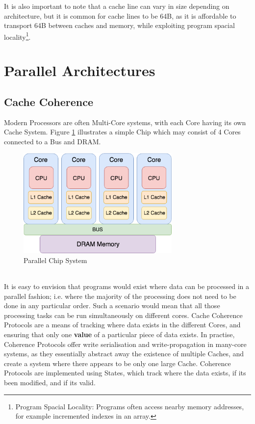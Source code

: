 \documentclass[bsc,frontabs,twoside,singlespacing,parskip,deptreport]{infthesis}     %
\begin{document}
It is also important to note that a cache line can vary in size depending on architecture, but it is common for cache lines to be 64B, as it is affordable to transport 64B between caches and memory, while exploiting program spacial locality\footnote{Program Spacial Locality: Programs often access nearby memory addresses, for example incremented indexes in an array.}.

\newpage

\section{Parallel Architectures}

\subsection{Cache Coherence}\label{cache-coherence}
Modern Processors are often Multi-Core systems, with each Core having its own Cache System. Figure \ref{fig:parallel-cpu} illustrates a simple Chip which may consist of 4 Cores connected to a Bus and DRAM. \\
\begin{figure}[!h]
    \centering
    \includegraphics[width=8cm]{Parallel.png}
    \caption{Parallel Chip System}
    \label{fig:parallel-cpu}
\end{figure} \\
It is easy to envision that programs would exist where data can be processed in a parallel fashion; i.e. where the majority of the processing does not need to be done in any particular order. Such a scenario would mean that all those processing tasks can be run simultaneously on different cores. Cache Coherence Protocols are a means of tracking where data exists in the different Cores, and ensuring that only one \textbf{value} of a particular piece of data exists. In practise, Coherence Protocols offer write serialisation and write-propagation in many-core systems, as they essentially abstract away the existence of multiple Caches, and create a system where there appears to be only one large Cache. Coherence Protocols are implemented using States, which track where the data exists, if its been modified, and if its valid.
\end{document}
